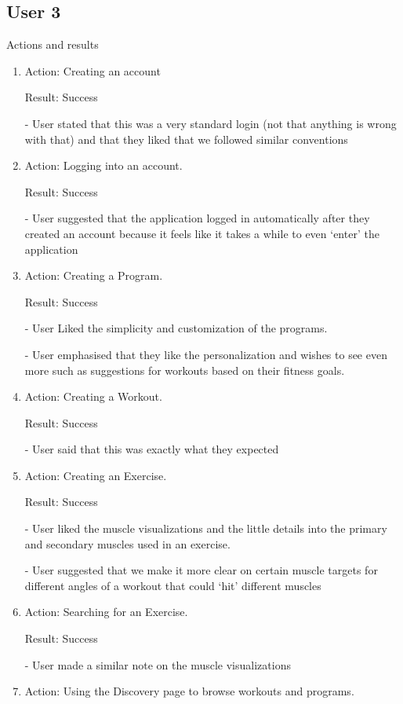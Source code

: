 \documentclass[12pt, titlepage]{article}
\begin{document}
\subsection{User 3}
Actions and results
\begin{enumerate}
\item Action: Creating an account

Result:  Success

-	User stated that this was a very standard login (not that anything is wrong with that) and that they liked that we followed similar conventions

\item Action: Logging into an account.

Result: Success

-	User suggested that the application logged in automatically after they created an account because it feels like it takes a while to even ‘enter’ the application


\item Action: Creating a Program.

Result: Success

-	User Liked the simplicity and customization of the programs.

-	User emphasised that they like the personalization and wishes to see even more such as suggestions for workouts based on their fitness goals.


\item Action: Creating a Workout.

Result: Success

-	User said that this was exactly what they expected 

\item Action: Creating an Exercise.

Result: Success

-	User liked the muscle visualizations and the little details into the primary and secondary muscles used in an exercise.

-	User suggested that we make it more clear on certain muscle targets for different angles of a workout that could ‘hit’ different muscles


\item Action: Searching for an Exercise.

Result: Success

-	User made a similar note on the muscle visualizations

\item Action: Using the Discovery page to browse workouts and programs.


\end{enumerate}
\end{document}

